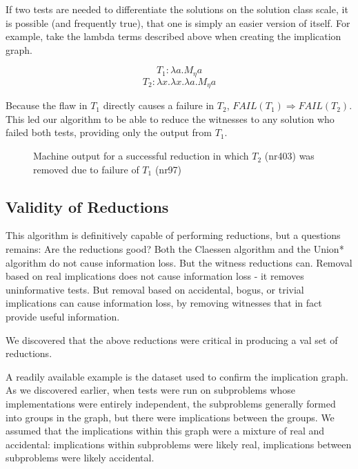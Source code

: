 \documentclass[11pt,twoside]{article}
\newcommand\fail{\mathit{FAIL}}
\begin{document}
If two tests are needed to differentiate the solutions on the solution class scale, it is possible (and frequently true), that one is simply an easier version of itself. For example, take the lambda terms described above when creating the implication graph. 

$$T_1 : \lambda a.M_\eta a$$
$$T_2 : \lambda x.\lambda x.\lambda a.M_\eta a$$

Because the flaw in $T_1$ directly causes a failure in $T_2$, $\fail(T_1) \Rightarrow \fail(T_2)$. This led our algorithm to be able to reduce the witnesses to any solution who failed both tests, providing only the output from $T_1$.

\begin{figure}

\caption{Machine output for a successful reduction in which $T_2$ (nr403) was removed due to failure of $T_1$ (nr97)}
\end{figure}

\subsection{Validity of Reductions}

This algorithm is definitively  capable of performing reductions, but a questions remains: Are the reductions good? Both the Claessen algorithm and the Union* algorithm do not cause information loss. But the witness reductions can. Removal based on real implications does not cause information loss - it removes uninformative tests. But removal based on accidental, bogus, or trivial implications can cause information loss, by removing witnesses that in fact provide useful information.

We discovered that the above reductions were critical in producing a val set of reductions.

A readily available example is the dataset used to confirm the implication graph. As we discovered earlier, when tests were run on subproblems whose implementations were entirely independent, the subproblems generally formed into groups in the  graph, but there were implications between the groups. We assumed that the implications within this graph were a mixture of real and accidental: implications within subproblems were likely real, implications between subproblems were likely accidental. 

\end{document}
